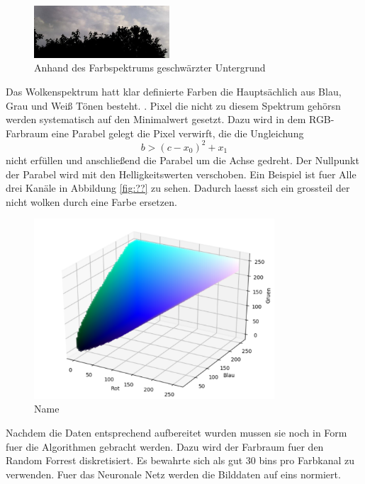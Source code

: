 \begin{figure}
		\centering
		\includegraphics[width=0.45\textwidth]{pictures/cut_out.pdf}
\caption{Anhand des Farbspektrums geschwärzter Untergrund}
\label{fig:}
\end{figure}
Das Wolkenspektrum hatt klar definierte Farben die Hauptsächlich aus Blau, Grau
und Weiß Tönen besteht. .
Pixel die nicht zu diesem Spektrum gehörsn werden systematisch auf den
Minimalwert gesetzt.
Dazu wird in dem RGB-Farbraum eine Parabel gelegt die Pixel verwirft, die die
Ungleichung 
\begin{equation}
		b > (c - x_0)^2 + x_1
\end{equation}
nicht erfüllen und anschließend die Parabel um die Achse gedreht.
Der Nullpunkt der Parabel wird mit den Helligkeitswerten verschoben.
Ein Beispiel ist fuer Alle  drei Kanäle in Abbildung \ref{fig:??} zu sehen.
Dadurch laesst sich ein grossteil der nicht wolken durch eine Farbe ersetzen.
\begin{figure}
		\centering
		\includegraphics[width=0.8\textwidth]{pictures/cut_cube.pdf}
		\caption{Name}
		\label{fig:name}
\end{figure}

Nachdem die Daten entsprechend aufbereitet wurden mussen sie noch in Form fuer
die Algorithmen gebracht werden. 
Dazu wird der Farbraum fuer den Random Forrest diskretisiert.
Es bewahrte sich als gut 30 bins pro Farbkanal zu verwenden.
Fuer das Neuronale Netz werden die Bilddaten auf eins normiert.

